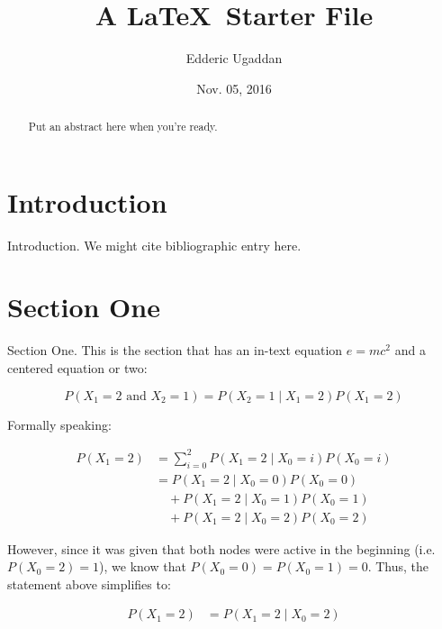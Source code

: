 \documentclass{amsart}
\title{A \LaTeX\ Starter File}
\author{Edderic Ugaddan}
\date{Nov. 05, 2016}
\theoremstyle{definition} %
\begin{document}
\begin{abstract}
 Put an abstract here when you're ready.
\end{abstract}

\maketitle

\tableofcontents

\section{Introduction}

Introduction.  We might cite bibliographic entry \cite{SJE} here.

\section{Section One}

Section One.  This is the section that has an in-text equation
\(e=mc^2\) and a centered equation or two:

\begin{equation}
  P(X_{1} = 2 \text{ and } X_{2} = 1) = P(X_{2} = 1 \mid X_{1} = 2) P(X_{1} = 2)
\end{equation}

Formally speaking:

\begin{equation}
\begin{split}
  P(X_{1} = 2) &= \sum_{i=0}^{2}{P(X_{1} = 2 \mid X_{0} = i) P(X_{0} = i)} \\
  &= P(X_{1} = 2 \mid X_{0} = 0) P(X_{0} = 0) \\
  &\quad +  P(X_{1} = 2 \mid X_{0} = 1) P(X_{0} = 1) \\
  &\quad + P(X_{1} = 2 \mid X_{0} = 2) P(X_{0} = 2)
\end{split}
\end{equation}


However, since it was given that both nodes were active in the beginning (i.e.
$P(X_{0} = 2) = 1$), we know that $P(X_{0} = 0) = P(X_{0} = 1) = 0$. Thus, the
statement above simplifies to:

\begin{equation}
\begin{aligned}
  P(X_{1} = 2) &= P(X_{1} = 2 \mid X_{0} = 2)
\end{aligned}
\end{equation}
\end{document}

